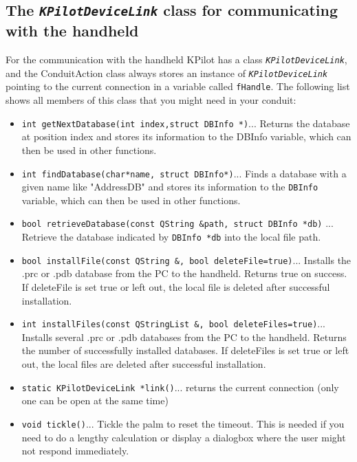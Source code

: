 \documentclass[10pt,a4paper]{article}
\newcommand{\code}[1]{{\small\texttt{#1}}}
\newcommand{\class}[1]{{\small\em\texttt{#1}}}
\begin{document}
\subsection{The \class{KPilotDeviceLink} class for communicating with the handheld}
For the communication with the handheld KPilot has a class 
\class{KPilotDeviceLink}, and the ConduitAction class always stores an 
instance of \class{KPilotDeviceLink} pointing to the current connection 
in a variable called \code{fHandle}. The following list shows all members 
of this class that you might need in your conduit:

\begin{itemize}
\item
    \code{int getNextDatabase(int index,struct DBInfo *)}\qquad ... Returns 
    the database at position index and stores its information to the DBInfo 
     variable, which can then be used in other functions.
\item
    \code{int findDatabase(char*name, struct DBInfo*)}\qquad ... Finds a 
    database with a given name like "AddressDB" and stores its information 
    to the \code{DBInfo} variable, which can then be used in other functions.

\item
    \code{bool retrieveDatabase(const QString \&path, struct DBInfo *db)}
    \qquad ... Retrieve the database indicated by \code{DBInfo *db} into 
    the local file path.


\item
    \code{bool installFile(const QString \&, bool deleteFile=true)}\qquad ... Installs the .prc 
    or .pdb database from the PC to the handheld. Returns true on success.
    If deleteFile is set true or left out, the local file is deleted after successful installation.
\item
    \code{int installFiles(const QStringList \&, bool deleteFiles=true)}\qquad ... Installs 
    several .prc or .pdb databases from the PC to the handheld. Returns 
    the number of successfully installed databases. If deleteFiles is set true 
    or left out, the local files are deleted after successful installation.



\item
    \code{static KPilotDeviceLink *link()}\qquad ... returns the current 
    connection (only one can be open at the same time)

\item
    \code{void tickle()}\qquad ... Tickle the palm to reset the timeout. 
    This is needed if you need to do a lengthy calculation or display a 
    dialogbox where the user might not respond immediately.


\end{itemize}
\end{document}
